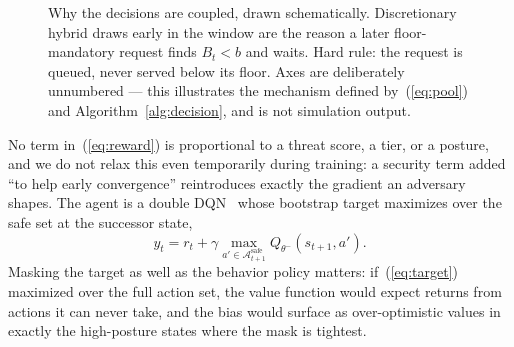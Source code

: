 \documentclass[conference]{IEEEtran}
\begin{document}
\begin{figure}[t]
\centering
{}
\caption{Why the decisions are coupled, drawn schematically. Discretionary
hybrid draws early in the window are the reason a later floor-mandatory
request finds $B_t < b$ and waits. Hard rule: the request is queued, never
served below its floor. Axes are deliberately unnumbered --- this illustrates
the mechanism defined by~(\ref{eq:pool}) and Algorithm~\ref{alg:decision}, and is not simulation output.}
\label{fig:coupling}
\end{figure}

No term in~(\ref{eq:reward}) is proportional to a threat score, a tier, or
a posture, and we do not relax this even temporarily during
training: a security term added ``to help early convergence''
reintroduces exactly the gradient an adversary shapes. The
agent is a double DQN~\cite{ref24} whose bootstrap target maximizes
over the safe set at the successor state,
\begin{equation}
y_t = r_t + \gamma \max_{a' \in \mathcal{A}^{\text{safe}}_{t+1}} Q_{\theta^-}(s_{t+1}, a').
\label{eq:target}
\end{equation}
Masking the target as well as the behavior policy matters:
if~(\ref{eq:target}) maximized over the full action set, the value function
would expect returns from actions it can never take, and the
bias would surface as over-optimistic values in exactly the
high-posture states where the mask is tightest.
\end{document}
